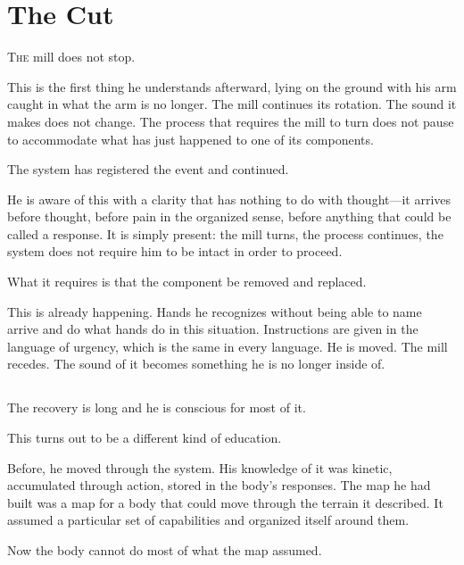 
\chapter{The Cut}


\lettrine{T}{he} mill does not stop.

This is the first thing he understands afterward, lying on the
ground with his arm caught in what the arm is no longer. The mill
continues its rotation. The sound it makes does not change. The
process that requires the mill to turn does not pause to
accommodate what has just happened to one of its components.

The system has registered the event and continued.

He is aware of this with a clarity that has nothing to do with
thought---it arrives before thought, before pain in the organized
sense, before anything that could be called a response. It is
simply present: the mill turns, the process continues, the system
does not require him to be intact in order to proceed.

What it requires is that the component be removed and replaced.

This is already happening. Hands he recognizes without being able
to name arrive and do what hands do in this situation. Instructions
are given in the language of urgency, which is the same in every
language. He is moved. The mill recedes. The sound of it becomes
something he is no longer inside of.

\section{}

The recovery is long and he is conscious for most of it.

This turns out to be a different kind of education.

Before, he moved through the system. His knowledge of it was
kinetic, accumulated through action, stored in the body's
responses. The map he had built was a map for a body that could
move through the terrain it described. It assumed a particular
set of capabilities and organized itself around them.

Now the body cannot do most of what the map assumed.

